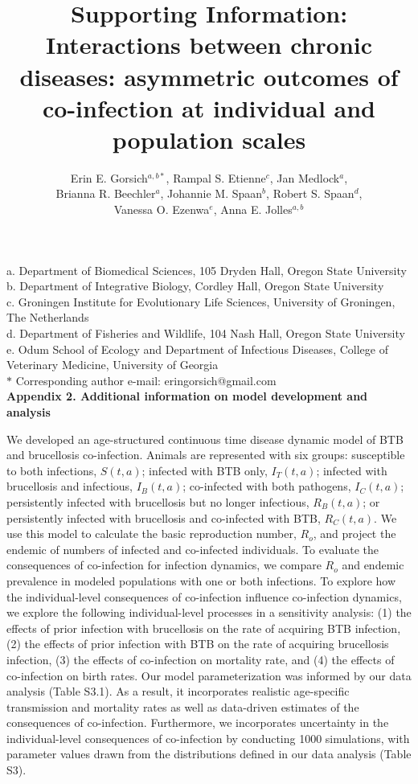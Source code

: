 \documentclass[11pt]{article}
\title{Supporting Information: \\
\textbf{Interactions between chronic diseases: asymmetric outcomes of co-infection at individual and population scales}}
\date{}
\author{Erin E. Gorsich$^{a,b*}$, Rampal S. Etienne$^{c}$, Jan Medlock$^{a}$, \\ Brianna R. Beechler$^{a}$, Johannie M. Spaan$^{b}$, Robert S. Spaan$^{d}$, \\Vanessa O. Ezenwa$^{e}$, Anna E. Jolles$^{a,b}$}
\begin{document}
\maketitle

\noindent{}a. Department of Biomedical Sciences, 105 Dryden Hall, Oregon State University \\
\noindent{}b. Department of Integrative Biology, Cordley Hall, Oregon State University \\
\noindent{}c. Groningen Institute for Evolutionary Life Sciences, University of Groningen, The Netherlands\\
\noindent{}d. Department of Fisheries and Wildlife, 104 Nash Hall, Oregon State University \\
\noindent{}e. Odum School of Ecology and Department of Infectious Diseases, College of Veterinary Medicine, University of Georgia \\
\noindent{}$\ast$ Corresponding author e-mail: eringorsich@gmail.com \\



\noindent \Large \textbf{Appendix 2. Additional information on model development and analysis}\\
\normalsize

We developed an age-structured continuous time disease dynamic model of BTB and brucellosis co-infection. 
Animals are represented with six groups: susceptible to both infections, $S(t, a)$; infected with BTB only, $I_T (t, a)$; infected with brucellosis and infectious, $I_B (t, a)$; co-infected with both pathogens, $I_C (t, a)$; persistently infected with brucellosis but no longer infectious, $R_B (t,a)$; or persistently infected with brucellosis and co-infected with BTB, $R_C (t, a)$. 
We use this model to calculate the basic reproduction number, $R_o$, and project the endemic of numbers of infected and co-infected individuals.
To evaluate the consequences of co-infection for infection dynamics, we compare $R_o$ and endemic prevalence in modeled populations with one or both infections.
To explore how the individual-level consequences of co-infection influence co-infection dynamics, we explore the following individual-level processes in a sensitivity analysis: (1) the effects of prior infection with brucellosis on the rate of acquiring BTB infection, (2) the effects of prior infection with BTB on the rate of acquiring brucellosis infection, (3) the effects of co-infection on mortality rate, and (4) the effects of co-infection on birth rates.
Our model parameterization was informed by our data analysis (Table S3.1). 
As a result, it incorporates realistic age-specific transmission and mortality rates as well as data-driven estimates of the consequences of co-infection.
Furthermore, we incorporates uncertainty in the individual-level consequences of co-infection by conducting 1000 simulations, with parameter values drawn from the distributions defined in our data analysis (Table S3). \\
\end{document}
